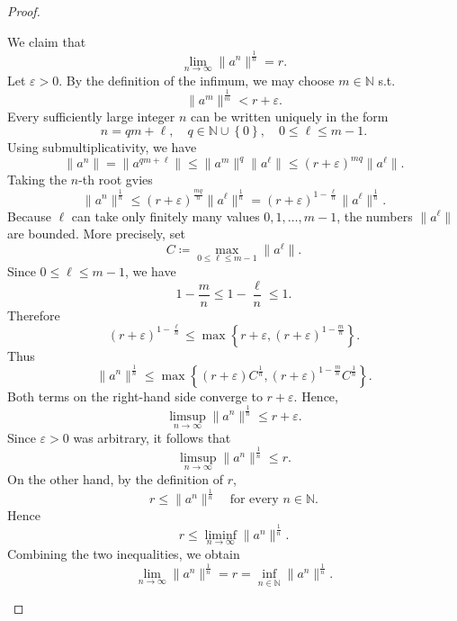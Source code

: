 \begin{proof}
\begin{enumerate}
        We claim that 
        \[
            \lim_{n \to \infty} \lVert a^n \rVert^{\frac{1}{n}} = r.  
        \]   
        Let \(\varepsilon > 0\). By the definition of the infimum, we may choose \(m \in \mathbb{N} \) s.t. 
        \[
            \lVert a^m \rVert^{\frac{1}{m}} < r + \varepsilon. 
        \]  
        Every sufficiently large integer \(n\) can be written uniquely in the form 
        \[
            n = qm+\ell , \quad q \in \mathbb{N} \cup \left\{ 0 \right\}, \quad 0 \le \ell \le m - 1. 
        \] 
        Using submultiplicativity, we have 
        \[
            \lVert a^n \rVert = \lVert a^{qm + \ell} \rVert \le \lVert a^m \rVert^q \lVert a^{\ell }  \rVert \le (r + \varepsilon)^{mq} \lVert a^{\ell }  \rVert. 
        \]
        Taking the \(n\)-th root gvies 
        \[
            \lVert a^n \rVert^{\frac{1}{n}} \le (r + \varepsilon)^{\frac{mq}{n}} \lVert a^{\ell } \rVert^{\frac{1}{n}} = (r + \varepsilon)^{1 - \frac{\ell}{n}} \lVert a^{\ell }  \rVert^{\frac{1}{n}} .  
        \] 
        Because \(\ell \) can take only finitely many values \(0, 1, \dots , m - 1\), the numbers \(\lVert a^{\ell }  \rVert \) are bounded. More precisely, set 
        \[
            C \coloneqq \max _{0 \le \ell \le m - 1} \lVert a^{\ell }  \rVert. 
        \]   
        Since \(0 \le \ell \le m - 1\), we have 
        \[
            1 - \frac{m}{n} \le 1 - \frac{\ell}{n} \le 1.
        \] 
        Therefore 
        \[
            (r + \varepsilon)^{1 - \frac{\ell}{n}} \le \max \left\{ r + \varepsilon, (r + \varepsilon )^{1 - \frac{m}{n}} \right\}. 
        \]
        Thus 
        \[
            \lVert a^n \rVert^{\frac{1}{n}} \le \max \left\{ (r + \varepsilon) C^{\frac{1}{n}}, (r + \varepsilon)^{1 - \frac{m}{n}} C^{\frac{1}{n}} \right\}.  
        \]
        Both terms on the right-hand side converge to \(r + \varepsilon\). Hence, 
        \[
            \limsup_{n \to \infty} \lVert a^n \rVert^{\frac{1}{n}} \le r + \varepsilon.  
        \] 
        Since \(\varepsilon > 0\) was arbitrary, it follows that 
        \[
            \limsup_{n \to \infty} \lVert a^n \rVert^{\frac{1}{n}} \le r.  
        \] 
        On the other hand, by the definition of \(r\),
        \[
            r \le \lVert a^n \rVert^{\frac{1}{n}} \quad \text{for every } n \in \mathbb{N} .  
        \] 
        Hence 
        \[
            r \le \liminf_{n \to \infty} \lVert a^n \rVert^{\frac{1}{n}}.  
        \]
        Combining the two inequalities, we obtain 
        \[
            \lim_{n \to \infty} \lVert a^n \rVert^{\frac{1}{n}} = r = \inf _{n \in \mathbb{N} } \lVert a^n \rVert^{\frac{1}{n}}.   
\]
\end{enumerate}
\end{proof}
